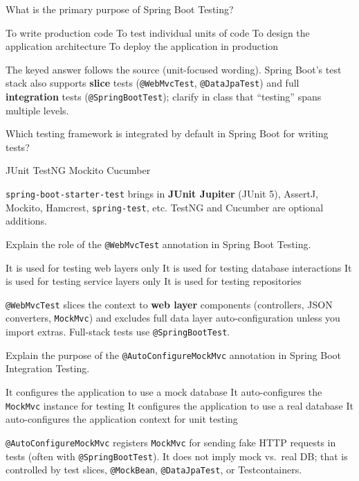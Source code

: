 \question[4]
What is the primary purpose of Spring Boot Testing?
\begin{choices}
  \choice To write production code
  \CorrectChoice To test individual units of code
  \choice To design the application architecture
  \choice To deploy the application in production
\end{choices}
\begin{solution}
  The keyed answer follows the source (unit-focused wording). Spring Boot's test stack also supports \textbf{slice} tests (\texttt{@WebMvcTest}, \texttt{@DataJpaTest}) and full \textbf{integration} tests (\texttt{@SpringBootTest}); clarify in class that ``testing'' spans multiple levels.
\end{solution}

\question[4]
Which testing framework is integrated by default in Spring Boot for writing tests?
\begin{choices}
  \CorrectChoice JUnit
  \choice TestNG
  \choice Mockito
  \choice Cucumber
\end{choices}
\begin{solution}
  \texttt{spring-boot-starter-test} brings in \textbf{JUnit Jupiter} (JUnit 5), AssertJ, Mockito, Hamcrest, \texttt{spring-test}, etc. TestNG and Cucumber are optional additions.
\end{solution}

\question[4]
Explain the role of the \texttt{@WebMvcTest} annotation in Spring Boot Testing.
\begin{choices}
  \CorrectChoice It is used for testing web layers only
  \choice It is used for testing database interactions
  \choice It is used for testing service layers only
  \choice It is used for testing repositories
\end{choices}
\begin{solution}
  \texttt{@WebMvcTest} slices the context to \textbf{web layer} components (controllers, JSON converters, \texttt{MockMvc}) and excludes full data layer auto-configuration unless you import extras. Full-stack tests use \texttt{@SpringBootTest}.
\end{solution}

\question[4]
Explain the purpose of the \texttt{@AutoConfigureMockMvc} annotation in Spring Boot Integration Testing.
\begin{choices}
  \choice It configures the application to use a mock database
  \CorrectChoice It auto-configures the \texttt{MockMvc} instance for testing
  \choice It configures the application to use a real database
  \choice It auto-configures the application context for unit testing
\end{choices}
\begin{solution}
  \texttt{@AutoConfigureMockMvc} registers \texttt{MockMvc} for sending fake HTTP requests in tests (often with \texttt{@SpringBootTest}). It does not imply mock vs.\ real DB; that is controlled by test slices, \texttt{@MockBean}, \texttt{@DataJpaTest}, or Testcontainers.
\end{solution}

